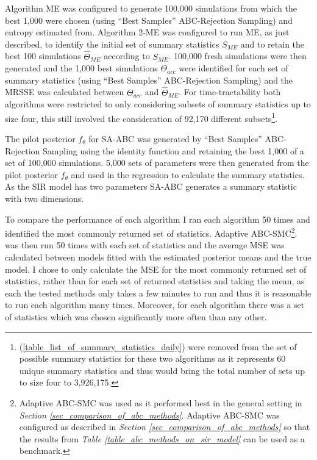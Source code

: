 \documentclass[11pt,a4paper]{article}
\theoremstyle{break}
\begin{document}
  \par Algorithm ME was configured to generate 100,000 simulations from which the best 1,000 were chosen (using ``Best Samples'' ABC-Rejection Sampling) and entropy estimated from. Algorithm 2-ME was configured to run ME, as just described, to identify the initial set of summary statistics $S_{ME}$ and to retain the best 100 simulations $\hat\Theta_{ME}$ according to $S_{ME}$. 100,000 fresh simulations were then generated and the 1,000 best simulations $\Theta_{acc}$ were identified for each set of summary statistics (using ``Best Samples'' ABC-Rejection Sampling) and the MRSSE was calculated between $\Theta_{acc}$ and $\hat\Theta_{ME}$. For time-tractability both algorithms were restricted to only considering subsets of summary statistics up to size four, this still involved the consideration of 92,170 different subsets\footnote{(\ref{table_list_of_summary_statistics_daily}) were removed from the set of possible summary statistics for these two algorithms as it represents 60 unique summary statistics and thus would bring the total number of sets up to size four to 3,926,175.}.

  \par The pilot posterior $f_{\theta}$ for SA-ABC was generated by ``Best Samples'' ABC-Rejection Sampling using the identity function and retaining the best 1,000 of a set of 100,000 simulations. 5,000 sets of parameters were then generated from the pilot posterior $f_\theta$ and used in the regression to calculate the summary statistics. As the SIR model has two parameters SA-ABC generates a summary statistic with two dimensions.

  \par To compare the performance of each algorithm I ran each algorithm 50 times and identified the most commonly returned set of statistics. Adaptive ABC-SMC\footnote{Adaptive ABC-SMC was used as it performed best in the general setting in \textit{Section \ref{sec_comparison_of_abc_methods}}. Adaptive ABC-SMC was configured as described in \textit{Section \ref{sec_comparison_of_abc_methods}} so that the results from \textit{Table \ref{table_abc_methods_on_sir_model}} can be used as a benchmark.}. was then run 50 times with each set of statistics and the average MSE was calculated between models fitted with the estimated posterior means and the true model. I chose to only calculate the MSE for the most commonly returned set of statistics, rather than for each set of returned statistics and taking the mean, as each the tested methods only takes a few minutes to run and thus it is reasonable to run each algorithm many times. Moreover, for each algorithm there was a set of statistics which was chosen significantly more often than any other.
\end{document}
